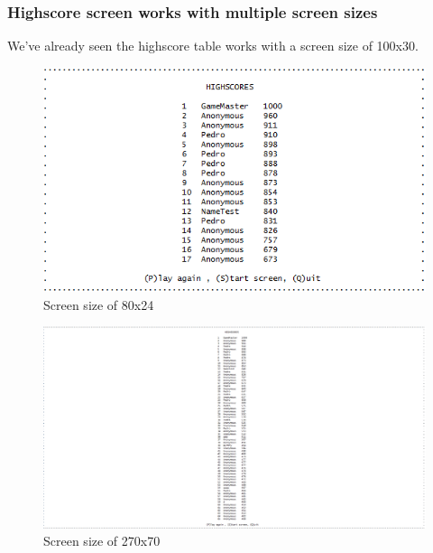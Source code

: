 \documentclass{article}
\begin{document}
\subsubsection*{Highscore screen works with multiple screen sizes}
We've already seen the highscore table works with a screen size of 100x30.
\begin{figure}[!ht]
	\begin{center}
	\includegraphics[width=0.6\paperwidth]{images/hscore_test_80x24}
	\caption{Screen size of 80x24}
	\label{fig:hscore_test_80x24} 
	\end{center}
\end{figure}
\begin{figure}[!ht]
	\begin{center}
	\includegraphics[width=0.6\paperwidth]{images/hscore_test_270x70}
	\caption{Screen size of 270x70}
	\label{fig:hscore_test_270x70} 
	\end{center}
\end{figure}
\newpage
\end{document}
